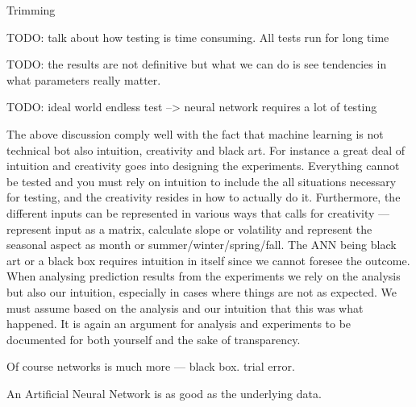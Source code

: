 

Trimming


TODO: talk about how testing is time consuming. All tests run for long time

TODO: the results are not definitive but what we can do is see tendencies in what parameters really matter.

TODO: ideal world endless test --> neural network requires a lot of testing

The above discussion comply well with the fact that machine learning is not technical bot also intuition, creativity and black art\cite{18}. For instance a great deal of intuition and creativity goes into designing the experiments. Everything cannot be tested and you must rely on intuition to include the all situations necessary for testing, and the creativity resides in how to actually do it. Furthermore, the different inputs can be represented in various ways that calls for creativity --- represent input as a matrix, calculate slope or volatility and represent the seasonal aspect as month or summer/winter/spring/fall. The ANN being black art or a black box requires intuition in itself since we cannot foresee the outcome. When analysing prediction results from the experiments we rely on the analysis but also our intuition, especially in cases where things are not as expected. We must assume based on the analysis and our intuition that this was what happened. It is again an argument for analysis and experiments to be documented for both yourself and the sake of transparency.








Of course networks is much more --- black box. trial error.



An Artificial Neural Network is as good as the underlying data. 



